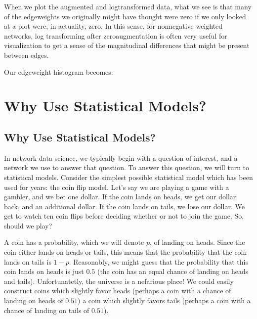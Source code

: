 \documentclass[letterpaper,10pt,english]{jupyterBook}
\begin{document}
\sphinxAtStartPar
When we plot the augmented and log\sphinxhyphen{}transformed data, what we see is that many of the edge\sphinxhyphen{}weights we originally might have thought were zero if we only looked at a plot were, in actuality,  zero. In this sense, for non\sphinxhyphen{}negative weighted networks, log transforming after zero\sphinxhyphen{}augmentation is often very useful for visualization to get a sense of the magnitudinal differences that might be present between edges.

\sphinxAtStartPar
Our edge\sphinxhyphen{}weight histogram becomes:


\chapter{Why Use Statistical Models?}
\label{\detokenize{representations/ch5/ch5:why-use-statistical-models}}\label{\detokenize{representations/ch5/ch5::doc}}

\section{Why Use Statistical Models?}
\label{\detokenize{representations/ch5/why-use-models:why-use-statistical-models}}\label{\detokenize{representations/ch5/why-use-models::doc}}
\sphinxAtStartPar
In network data science, we typically begin with a question of interest, and a network we use to answer that question. To answer this question, we will turn to statistical models. Consider the simplest possible statistical model which has been used for years: the coin flip model. Let’s say we are playing a game with a gambler, and we bet one dollar. If the coin lands on heads, we get our dollar back, and an additional dollar. If the coin lands on tails, we lose our dollar. We get to watch ten coin flips before deciding whether or not to join the game. So, should we play?

\sphinxAtStartPar
A coin has a probability, which we will denote \(p\), of landing on heads. Since the coin either lands on heads or tails, this means that the probability that the coin lands on tails is \(1-p\). Reasonably, we might guess that the probability that this coin lands on heads is just \(0.5\) (the coin has an equal chance of landing on heads and tails). Unfortunatetly, the universe is a nefarious place! We could easily construct coins which slightly favor heads (perhaps a coin with a chance of landing on heads of \(0.51\))  a coin which slightly favors tails (perhaps a coin with a chance of landing on tails of \(0.51\)).
\end{document}
